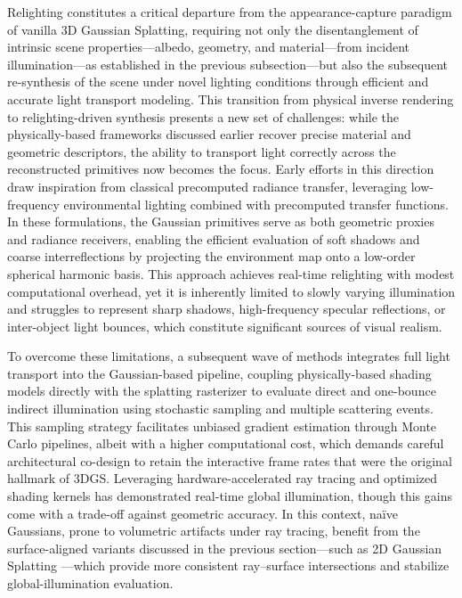 \documentclass[11pt,a4paper]{article}
\begin{document}
Relighting constitutes a critical departure from the appearance-capture paradigm of vanilla 3D Gaussian Splatting, requiring not only the disentanglement of intrinsic scene properties---albedo, geometry, and material---from incident illumination---as established in the previous subsection---but also the subsequent re-synthesis of the scene under novel lighting conditions through efficient and accurate light transport modeling. This transition from physical inverse rendering to relighting-driven synthesis presents a new set of challenges: while the physically-based frameworks discussed earlier recover precise material and geometric descriptors, the ability to transport light correctly across the reconstructed primitives now becomes the focus. Early efforts in this direction draw inspiration from classical precomputed radiance transfer, leveraging low-frequency environmental lighting combined with precomputed transfer functions. In these formulations, the Gaussian primitives serve as both geometric proxies and radiance receivers, enabling the efficient evaluation of soft shadows and coarse interreflections by projecting the environment map onto a low-order spherical harmonic basis. This approach achieves real-time relighting with modest computational overhead, yet it is inherently limited to slowly varying illumination and struggles to represent sharp shadows, high-frequency specular reflections, or inter-object light bounces, which constitute significant sources of visual realism.

To overcome these limitations, a subsequent wave of methods integrates full light transport into the Gaussian-based pipeline, coupling physically-based shading models directly with the splatting rasterizer to evaluate direct and one-bounce indirect illumination using stochastic sampling and multiple scattering events. This sampling strategy facilitates unbiased gradient estimation through Monte Carlo pipelines, albeit with a higher computational cost, which demands careful architectural co-design to retain the interactive frame rates that were the original hallmark of 3DGS. Leveraging hardware-accelerated ray tracing and optimized shading kernels has demonstrated real-time global illumination, though this gains come with a trade-off against geometric accuracy. In this context, na\"{i}ve Gaussians, prone to volumetric artifacts under ray tracing, benefit from the surface-aligned variants discussed in the previous section---such as 2D Gaussian Splatting \cite{arxiv:2403.17888v1}---which provide more consistent ray--surface intersections and stabilize global-illumination evaluation.
\end{document}
